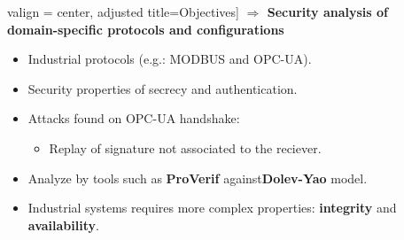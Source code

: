\documentclass{beamer}
\newcommand{\proverif}{ProVerif\xspace}
\newcommand{\modbus}{MODBUS\xspace}
\newcommand{\opcua}{OPC-UA\xspace}
\newcommand{\eg}{e.g.:\xspace}
\begin{document}
\begin{frame}[fragile]{}
\begin{tcolorbox}[adjusted title={\centering\large Formal Analysis of Industrial Protocols}]
\begin{columns}[T]
\begin{column}{.35\textwidth}
\begin{tcolorbox}
                valign = center,
                adjusted title={\large Objectives}]
                    \vspace{.5em}
                    {\bf $\Rightarrow$ Security analysis of domain-specific protocols and configurations}
                    \begin{itemize}
                        \item Industrial protocols (\eg \modbus and \opcua).
                        \vspace{.5em}
                        \vspace{-1.3em}
                        \item Security properties of secrecy and authentication.
                        \vspace{.7em}
                        \item Attacks found on \opcua handshake:
                        \begin{itemize}
                            \item Replay of signature not associated to the reciever.
                        \end{itemize}
                        \vspace{.7em}
                        \item Analyze by tools such as {\bf \proverif} against{\bf Dolev-Yao} model.
                        \vspace{.7em}
                        \item Industrial systems requires more complex properties: {\bf integrity} and {\bf availability}.
                    \end{itemize}
                \end{tcolorbox}
            \end{column}
            \begin{column}{.65\textwidth}
                \begin{tcolorbox}[
                colback=white, %
                colframe=normalTitleBlockColor, %
                colframe=gray!20, %
                boxrule=1mm,
                coltext=black, %
                coltitle=black, %
                bottom=2mm,
                equal height group=B,
                valign = center,
                adjusted title={\large Approach}]
                    \begin{columns}[c]

\end{columns}
\end{tcolorbox}
\end{column}
\end{columns}
\end{tcolorbox}
\end{frame}
\end{document}
